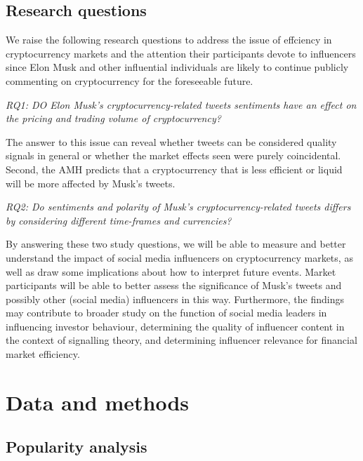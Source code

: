 \documentclass[
]{article}
\begin{document}
\hypertarget{research-questions}{%
\subsection{Research questions}\label{research-questions}}

We raise the following research questions to address the issue of
effciency in cryptocurrency markets and the attention their participants
devote to influencers since Elon Musk and other influential individuals
are likely to continue publicly commenting on cryptocurrency for the
foreseeable future.

\emph{RQ1: DO Elon Musk's cryptocurrency-related tweets sentiments have
an effect on the pricing and trading volume of cryptocurrency?}

The answer to this issue can reveal whether tweets can be considered
quality signals in general or whether the market effects seen were
purely coincidental. Second, the AMH predicts that a cryptocurrency that
is less efficient or liquid will be more affected by Musk's tweets.

\emph{RQ2: Do sentiments and polarity of Musk's cryptocurrency-related
tweets differs by considering different time-frames and currencies?}

By answering these two study questions, we will be able to measure and
better understand the impact of social media influencers on
cryptocurrency markets, as well as draw some implications about how to
interpret future events. Market participants will be able to better
assess the significance of Musk's tweets and possibly other (social
media) influencers in this way. Furthermore, the findings may contribute
to broader study on the function of social media leaders in influencing
investor behaviour, determining the quality of influencer content in the
context of signalling theory, and determining influencer relevance for
financial market efficiency.

\hypertarget{data-and-methods}{%
\section{Data and methods}\label{data-and-methods}}

\hypertarget{popularity-analysis}{%
\subsection{Popularity analysis}\label{popularity-analysis}}
\end{document}
